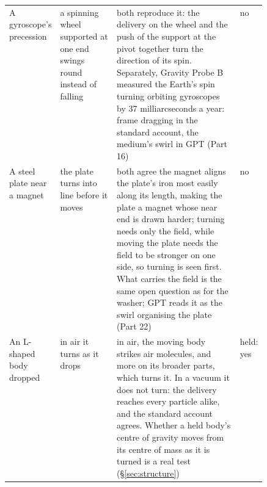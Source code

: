 \documentclass[11pt,a4paper]{article}
\begin{document}
\begin{table}[p]
\begin{tabularx}{\linewidth}{@{}>{\raggedright\arraybackslash}p{0.18\linewidth} >{\raggedright\arraybackslash}p{0.22\linewidth} >{\raggedright\arraybackslash}X >{\raggedright\arraybackslash}p{0.09\linewidth}@{}}
A gyroscope's precession & a spinning wheel supported at one end swings round instead of falling & both reproduce it: the delivery on the wheel and the push of the support at the pivot together turn the direction of its spin. Separately, Gravity Probe B measured the Earth's spin turning orbiting gyroscopes by 37 milliarcseconds a year: frame dragging in the standard account, the medium's swirl in GPT (Part 16) & no\\
A steel plate near a magnet & the plate turns into line before it moves & both agree the magnet aligns the plate's iron most easily along its length, making the plate a magnet whose near end is drawn harder; turning needs only the field, while moving the plate needs the field to be stronger on one side, so turning is seen first. What carries the field is the same open question as for the washer; GPT reads it as the swirl organising the plate (Part 22) & no\\
An L-shaped body dropped & in air it turns as it drops & in air, the moving body strikes air molecules, and more on its broader parts, which turns it. In a vacuum it does not turn: the delivery reaches every particle alike, and the standard account agrees. Whether a held body's centre of gravity moves from its centre of mass as it is turned is a real test (§\ref{sec:structure}) & held: yes\\
\bottomrule
\end{tabularx}\label{tab:demos}\end{table}
\end{document}
